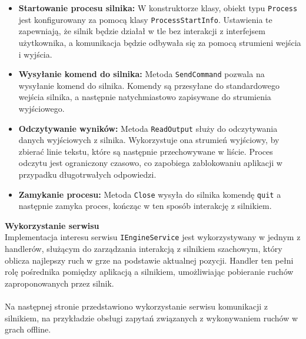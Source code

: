 \documentclass[twoside]{projektInzynierskiMS1}
\begin{document}
\begin{itemize} 
    \item \textbf{Startowanie procesu silnika:} W konstruktorze klasy, obiekt typu \texttt{Process} jest konfigurowany za pomocą klasy \texttt{ProcessStartInfo}. Ustawienia te zapewniają, że silnik będzie działał w tle bez interakcji z interfejsem użytkownika, a komunikacja będzie odbywała się za pomocą strumieni wejścia i wyjścia. 
    \item \textbf{Wysyłanie komend do silnika:} Metoda \texttt{SendCommand} pozwala na wysyłanie komend do silnika. Komendy są przesyłane do standardowego wejścia silnika, a następnie natychmiastowo zapisywane do strumienia wyjściowego. 
    \item \textbf{Odczytywanie wyników:} Metoda \texttt{ReadOutput} służy do odczytywania danych wyjściowych z silnika. Wykorzystuje ona strumień wyjściowy, by zbierać linie tekstu, które są następnie przechowywane w liście. Proces odczytu jest ograniczony czasowo, co zapobiega zablokowaniu aplikacji w przypadku długotrwałych odpowiedzi. 
    \item \textbf{Zamykanie procesu:} Metoda \texttt{Close} wysyła do silnika komendę \texttt{quit} a następnie zamyka proces, kończąc w ten sposób interakcję z silnikiem. 
\end{itemize}

\noindent \textbf{Wykorzystanie serwisu}\\
Implementacja interesu serwisu \texttt{IEngineService} jest wykorzystywany w jednym z handlerów, służącym do zarządzania interakcją z silnikiem szachowym, który oblicza najlepszy ruch w grze na podstawie aktualnej pozycji. Handler ten pełni rolę pośrednika pomiędzy aplikacją a silnikiem, umożliwiając pobieranie ruchów zaproponowanych przez silnik.
\\\\
Na następnej stronie przedstawiono wykorzystanie serwisu komunikacji z silnikiem, na przykładzie obsługi zapytań związanych z wykonywaniem ruchów w grach offline.

\newpage
\end{document}
